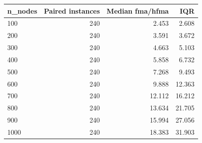 \begin{tabular}{lrrr}
\toprule
n\_nodes & Paired instances & Median fma/hfma & IQR \\
\midrule
100 & 240 & 2.453 & 2.608 \\
200 & 240 & 3.591 & 3.672 \\
300 & 240 & 4.663 & 5.103 \\
400 & 240 & 5.858 & 6.732 \\
500 & 240 & 7.268 & 9.493 \\
600 & 240 & 9.888 & 12.363 \\
700 & 240 & 12.112 & 16.212 \\
800 & 240 & 13.634 & 21.705 \\
900 & 240 & 15.994 & 27.056 \\
1000 & 240 & 18.383 & 31.903 \\
\bottomrule
\end{tabular}
